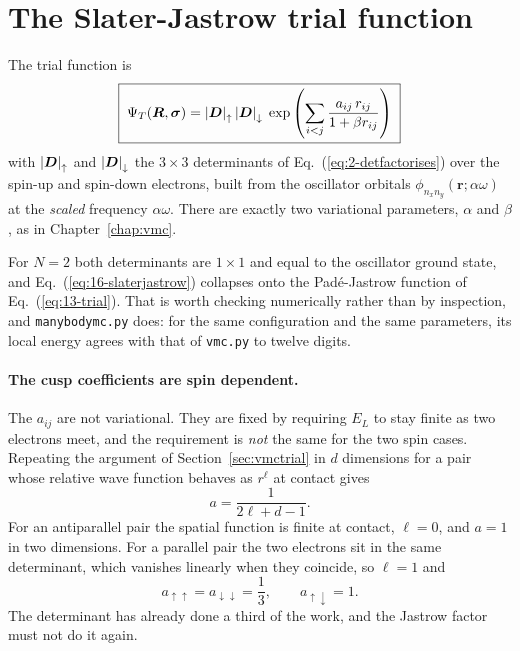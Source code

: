 \section{The Slater-Jastrow trial function}
\label{sec:appansatz}

The trial function is
\begin{equation}
  \boxed{\;
  \Psi_T(\bm{R},\bm{\sigma})
   = {|\boldsymbol{D}|}_{\uparrow}\,{|\boldsymbol{D}|}_{\downarrow}\;
     \exp\left(\sum_{i<j}\frac{a_{ij}\,r_{ij}}{1+\beta r_{ij}}\right) \;}
  \label{eq:16-slaterjastrow}
\end{equation}
with ${|\boldsymbol{D}|}_{\uparrow}$ and ${|\boldsymbol{D}|}_{\downarrow}$ the $3\times3$
determinants of Eq.~(\ref{eq:2-detfactorises}) over the spin-up and spin-down
electrons, built from the oscillator orbitals
$\phi_{n_xn_y}(\bm{r};\alpha\omega)$ at the \emph{scaled} frequency
$\alpha\omega$.  There are exactly two variational parameters, $\alpha$ and
$\beta$, as in Chapter~\ref{chap:vmc}.

For $N=2$ both determinants are $1\times1$ and equal to the oscillator ground
state, and Eq.~(\ref{eq:16-slaterjastrow}) collapses onto the Pad\'e-Jastrow
function of Eq.~(\ref{eq:13-trial}).  That is worth checking numerically rather
than by inspection, and \texttt{manybodymc.py} does: for the same
configuration and the same parameters, its local energy agrees with that of
\texttt{vmc.py} to twelve digits.

\paragraph{The cusp coefficients are spin dependent.}
The $a_{ij}$ are not variational.  They are fixed by requiring $E_L$ to stay
finite as two electrons meet, and the requirement is \emph{not} the same for
the two spin cases.  Repeating the argument of Section~\ref{sec:vmctrial} in
$d$ dimensions for a pair whose relative wave function behaves as $r^{\ell}$ at
contact gives
\begin{equation}
  a = \frac{1}{2\ell + d - 1} .
  \label{eq:16-cusp}
\end{equation}
For an antiparallel pair the spatial function is finite at contact, $\ell=0$,
and $a=1$ in two dimensions.  For a parallel pair the two electrons sit in the
same determinant, which vanishes linearly when they coincide, so $\ell=1$ and
\begin{equation}
  a_{\uparrow\uparrow} = a_{\downarrow\downarrow} = \frac{1}{3},
  \qquad
  a_{\uparrow\downarrow} = 1 .
  \label{eq:16-cuspvalues}
\end{equation}
The determinant has already done a third of the work, and the Jastrow factor
must not do it again.

